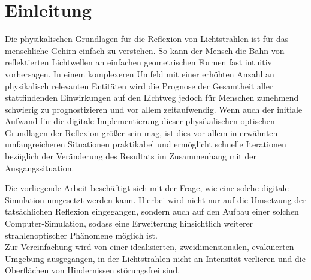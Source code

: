 \chapter{Einleitung}
Die physikalischen Grundlagen für die Reflexion von Lichtstrahlen 
ist für das menschliche Gehirn einfach zu verstehen. 
So kann der Mensch die Bahn von reflektierten Lichtwellen 
an einfachen geometrischen Formen fast intuitiv vorhersagen. 
In einem komplexeren Umfeld mit einer erhöhten Anzahl an 
physikalisch relevanten Entitäten wird die Prognose 
der Gesamtheit aller stattfindenden Einwirkungen auf den 
Lichtweg jedoch für Menschen zunehmend schwierig 
zu prognostizieren und vor allem zeitaufwendig.
Wenn auch der initiale Aufwand für die digitale Implementierung dieser physikalischen 
optischen Grundlagen der Reflexion größer sein mag, 
ist dies vor allem in erwähnten umfangreicheren Situationen praktikabel und ermöglicht 
schnelle Iterationen bezüglich der Veränderung 
des Resultats im Zusammenhang mit der Ausgangssituation. 

Die vorliegende Arbeit beschäftigt sich mit der Frage, 
wie eine solche digitale Simulation umgesetzt werden kann. 
Hierbei wird nicht nur auf die Umsetzung der tatsächlichen 
Reflexion eingegangen, sondern auch auf 
den Aufbau einer solchen Computer-Simulation, 
sodass eine Erweiterung hinsichtlich weiterer strahlenoptischer 
Phänomene möglich ist. \\ 
Zur Vereinfachung wird von einer idealisierten, zweidimensionalen, 
evakuierten Umgebung ausgegangen, 
in der Lichtstrahlen nicht an Intensität verlieren
und die Oberflächen von Hindernissen störungsfrei sind.